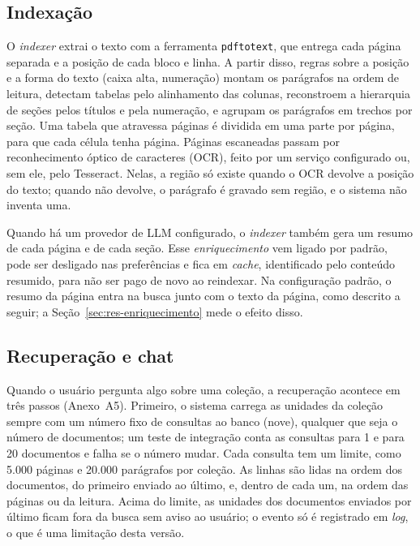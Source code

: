 \documentclass[12pt]{article}
\begin{document}
\subsection{Indexação}
\label{sec:indexacao}

O \emph{indexer} extrai o texto com a ferramenta \texttt{pdftotext}, que entrega cada página separada e a posição de cada bloco e linha. A partir disso, regras sobre a posição e a forma do texto (caixa alta, numeração) montam os parágrafos na ordem de leitura, detectam tabelas pelo alinhamento das colunas, reconstroem a hierarquia de seções pelos títulos e pela numeração, e agrupam os parágrafos em trechos por seção. Uma tabela que atravessa páginas é dividida em uma parte por página, para que cada célula tenha página. Páginas escaneadas passam por reconhecimento óptico de caracteres (OCR), feito por um serviço configurado ou, sem ele, pelo Tesseract. Nelas, a região só existe quando o OCR devolve a posição do texto; quando não devolve, o parágrafo é gravado sem região, e o sistema não inventa uma.

Quando há um provedor de LLM configurado, o \emph{indexer} também gera um resumo de cada página e de cada seção. Esse \emph{enriquecimento} vem ligado por padrão, pode ser desligado nas preferências e fica em \emph{cache}, identificado pelo conteúdo resumido, para não ser pago de novo ao reindexar. Na configuração padrão, o resumo da página entra na busca junto com o texto da página, como descrito a seguir; a Seção~\ref{sec:res-enriquecimento} mede o efeito disso.

\subsection{Recuperação e chat}
\label{sec:recuperacao}

Quando o usuário pergunta algo sobre uma coleção, a recuperação acontece em três passos (Anexo~A5). Primeiro, o sistema carrega as unidades da coleção sempre com um número fixo de consultas ao banco (nove), qualquer que seja o número de documentos; um teste de integração conta as consultas para 1 e para 20 documentos e falha se o número mudar. Cada consulta tem um limite, como 5.000 páginas e 20.000 parágrafos por coleção. As linhas são lidas na ordem dos documentos, do primeiro enviado ao último, e, dentro de cada um, na ordem das páginas ou da leitura. Acima do limite, as unidades dos documentos enviados por último ficam fora da busca sem aviso ao usuário; o evento só é registrado em \emph{log}, o que é uma limitação desta versão.
\end{document}
